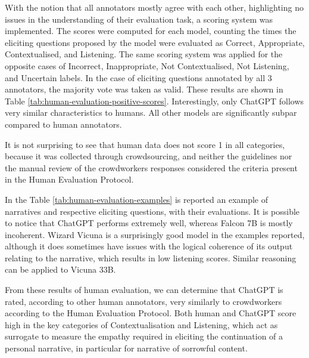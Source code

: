 
With the notion that all annotators mostly agree with each other, highlighting no issues in the understanding of their evaluation task, a scoring system was implemented. The scores were computed for each model, counting the times the eliciting questions proposed by the model were evaluated as Correct, Appropriate, Contextualised, and Listening. The same scoring system was applied for the opposite cases of Incorrect, Inappropriate, Not Contextualised, Not Listening, and Uncertain labels. In the case of eliciting questions annotated by all 3 annotators, the majority vote was taken as valid. These results are shown in Table \ref{tab:human-evaluation-positive-scores}.
Interestingly, only ChatGPT follows very similar characteristics to humans. All other models are significantly subpar compared to human annotators. 


% 
It is not surprising to see that human data does not score 1 in all categories, because it was collected through crowdsourcing, and neither the guidelines nor the manual review of the crowdworkers responses considered the criteria present in the Human Evaluation Protocol. 

In the Table \ref{tab:human-evaluation-examples} is reported an example of narratives and respective eliciting questions, with their evaluations. It is possible to notice that ChatGPT performs extremely well, whereas Falcon 7B is mostly incoherent. Wizard Vicuna is a surprisingly good model in the examples reported, although it does sometimes have issues with the logical coherence of its output relating to the narrative, which results in low listening scores. Similar reasoning can be applied to Vicuna 33B.




From these results of human evaluation, we can determine that ChatGPT is rated, according to other human annotators, very similarly to crowdworkers according to the Human Evaluation Protocol. Both human and ChatGPT score high in the key categories of Contextualisation and Listening, which act as surrogate to measure the empathy required in eliciting the continuation of a personal narrative, in particular for narrative of sorrowful content.
